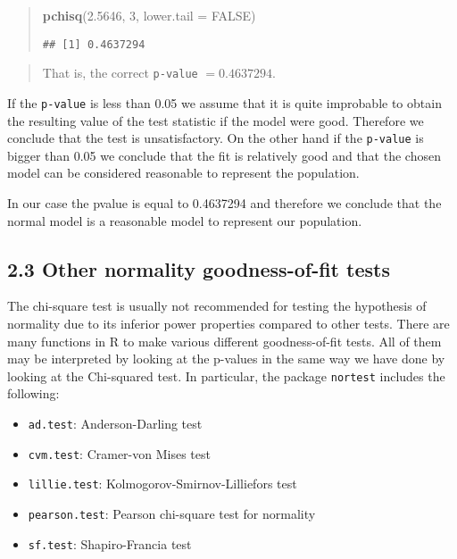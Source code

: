 \documentclass[
]{article}
\newenvironment{Shaded}{\begin{snugshade}}{\end{snugshade}}
\newcommand{\AttributeTok}[1]{\textcolor[rgb]{0.13,0.29,0.53}{#1}}
\newcommand{\ConstantTok}[1]{\textcolor[rgb]{0.56,0.35,0.01}{#1}}
\newcommand{\DecValTok}[1]{\textcolor[rgb]{0.00,0.00,0.81}{#1}}
\newcommand{\FloatTok}[1]{\textcolor[rgb]{0.00,0.00,0.81}{#1}}
\newcommand{\FunctionTok}[1]{\textcolor[rgb]{0.13,0.29,0.53}{\textbf{#1}}}
\newcommand{\NormalTok}[1]{#1}
\providecommand{\tightlist}{%
  \setlength{\itemsep}{0pt}\setlength{\parskip}{0pt}}
\begin{document}
\begin{quote}
\begin{Shaded}
\begin{Highlighting}[]
\FunctionTok{pchisq}\NormalTok{(}\FloatTok{2.5646}\NormalTok{, }\DecValTok{3}\NormalTok{, }\AttributeTok{lower.tail =} \ConstantTok{FALSE}\NormalTok{)}
\end{Highlighting}
\end{Shaded}

\begin{verbatim}
## [1] 0.4637294
\end{verbatim}
\end{quote}

\begin{quote}
That is, the correct \texttt{p-value} \(= 0.4637294\).
\end{quote}

If the \texttt{p-value} is less than 0.05 we assume that it is quite
improbable to obtain the resulting value of the test statistic if the
model were good. Therefore we conclude that the test is unsatisfactory.
On the other hand if the \texttt{p-value} is bigger than 0.05 we
conclude that the fit is relatively good and that the chosen model can
be considered reasonable to represent the population.

In our case the pvalue is equal to 0.4637294 and therefore we conclude
that the normal model is a reasonable model to represent our population.

\hypertarget{other-normality-goodness-of-fit-tests}{%
\subsection{2.3 Other normality goodness-of-fit
tests}\label{other-normality-goodness-of-fit-tests}}

The chi-square test is usually not recommended for testing the
hypothesis of normality due to its inferior power properties compared to
other tests. There are many functions in \textsf{R} to make various
different goodness-of-fit tests. All of them may be interpreted by
looking at the p-values in the same way we have done by looking at the
Chi-squared test. In particular, the package \texttt{nortest} includes
the following:

\begin{itemize}
\tightlist
\item
  \texttt{ad.test}: Anderson-Darling test
\item
  \texttt{cvm.test}: Cramer-von Mises test
\item
  \texttt{lillie.test}: Kolmogorov-Smirnov-Lilliefors test
\item
  \texttt{pearson.test}: Pearson chi-square test for normality
\item
  \texttt{sf.test}: Shapiro-Francia test
\end{itemize}
\end{document}
